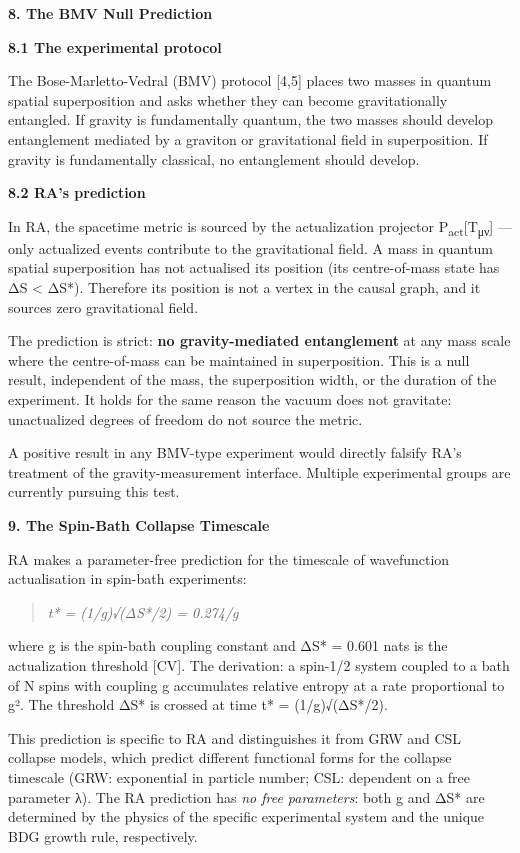 \documentclass[12pt,a4paper]{article}
\begin{document}
\textbf{8. The BMV Null Prediction}

\textbf{8.1 The experimental protocol}

The Bose-Marletto-Vedral (BMV) protocol {[}4,5{]} places two masses in
quantum spatial superposition and asks whether they can become
gravitationally entangled. If gravity is fundamentally quantum, the two
masses should develop entanglement mediated by a graviton or
gravitational field in superposition. If gravity is fundamentally
classical, no entanglement should develop.

\textbf{8.2 RA's prediction}

In RA, the spacetime metric is sourced by the actualization projector
P\textsubscript{act}{[}T\textsubscript{μν}{]} --- only actualized events
contribute to the gravitational field. A mass in quantum spatial
superposition has not actualised its position (its centre-of-mass state
has ΔS \textless{} ΔS*). Therefore its position is not a vertex in the
causal graph, and it sources zero gravitational field.

The prediction is strict: \textbf{no gravity-mediated entanglement} at
any mass scale where the centre-of-mass can be maintained in
superposition. This is a null result, independent of the mass, the
superposition width, or the duration of the experiment. It holds for the
same reason the vacuum does not gravitate: unactualized degrees of
freedom do not source the metric.

A positive result in any BMV-type experiment would directly falsify RA's
treatment of the gravity-measurement interface. Multiple experimental
groups are currently pursuing this test.

\textbf{9. The Spin-Bath Collapse Timescale}

RA makes a parameter-free prediction for the timescale of wavefunction
actualisation in spin-bath experiments:

\begin{quote}
\emph{t* = (1/g)√(ΔS*/2) = 0.274/g}
\end{quote}

where g is the spin-bath coupling constant and ΔS* = 0.601 nats is the
actualization threshold {[}CV{]}. The derivation: a spin-1/2 system
coupled to a bath of N spins with coupling g accumulates relative
entropy at a rate proportional to g². The threshold ΔS* is crossed at
time t* = (1/g)√(ΔS*/2).

This prediction is specific to RA and distinguishes it from GRW and CSL
collapse models, which predict different functional forms for the
collapse timescale (GRW: exponential in particle number; CSL: dependent
on a free parameter λ). The RA prediction has \emph{no free parameters}:
both g and ΔS* are determined by the physics of the specific
experimental system and the unique BDG growth rule, respectively.
\end{document}
